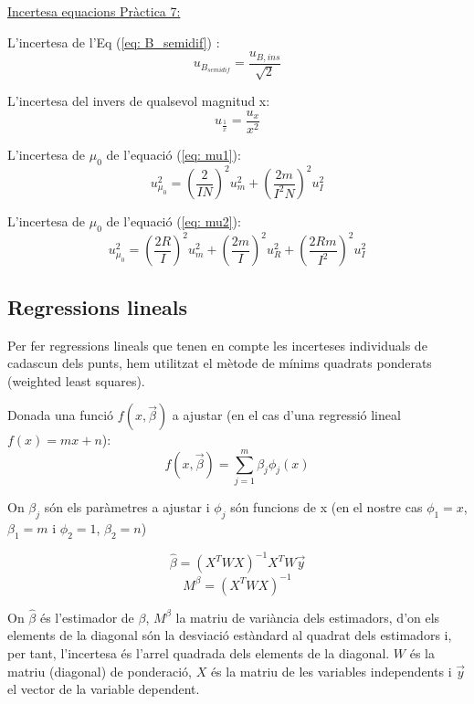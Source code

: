 \documentclass[11pt]{article}
\numberwithin{equation}{section}
\numberwithin{figure}{section}
\numberwithin{table}{section}
\begin{document}
\underline{Incertesa equacions Pràctica 7:}

L'incertesa de l'Eq (\ref{eq: B_semidif}) :
\begin{equation}
    u_{B_{semidif}} = \frac{u_{B,ins}}{\sqrt{2}}
\end{equation}

L'incertesa del invers de qualsevol magnitud x:
\begin{equation}
    u_{\frac{1}{x}} = \frac{u_x}{x^2}
\end{equation}

L'incertesa de $\mu_0$ de l'equació (\ref{eq: mu1}):
\begin{equation}
    u_{\mu_0}^2 = \left(\frac{2}{IN}\right)^2u_m^2 + \left(\frac{2m}{I^2N}\right)^2u_I^2
\end{equation}

L'incertesa de $\mu_0$ de l'equació (\ref{eq: mu2}):
\begin{equation}
    u_{\mu_0}^2 = \left(\frac{2R}{I}\right)^2u_m^2 + \left(\frac{2m}{I}\right)^2u_R^2 + \left(\frac{2Rm}{I^2}\right)^2u_I^2
\end{equation}

\subsection{Regressions lineals} \label{sec: Ap_Regr}
Per fer regressions lineals que tenen en compte les incerteses individuals de cadascun dels punts, hem utilitzat el mètode de mínims quadrats ponderats (weighted least squares).
 
 Donada una funció $f(x,\vec{\beta})$ a ajustar (en el cas d'una regressió lineal $f(x) = mx+n$):
 \begin{equation}
     f(x,\vec{\beta}) = \sum_{j=1}^m\beta_j\phi_j(x)
 \end{equation}
 
  On ${\beta_j}$ són els paràmetres a ajustar i $\phi_j$ són funcions de x (en el nostre cas $\phi_1 = x$, $\beta_1 = m$ i $\phi_2 = 1$, $\beta_2 = n$)
 
 \begin{equation}
     \hat{\beta} = (X^TWX)^{-1}X^TW\vec{y}
 \end{equation}
 \begin{equation}
     M^\beta = (X^TWX)^{-1}
 \end{equation}
 
 On $\hat{\beta}$ és l'estimador de $\beta$, $M^\beta$ la matriu de variància dels estimadors, d'on els elements de la diagonal són la desviació estàndard al quadrat dels estimadors i, per tant, l'incertesa és l'arrel quadrada dels elements de la diagonal. $W$ és la matriu (diagonal) de ponderació, $X$ és la matriu de les variables independents i $\vec{y}$ el vector de la variable dependent.
 
\end{document}

